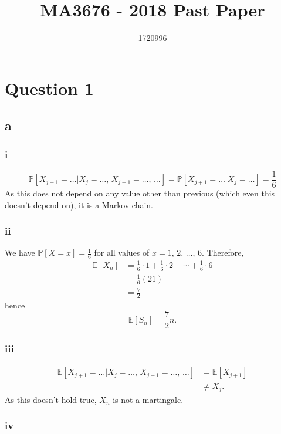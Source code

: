 \documentclass{article}
\title{MA3676 -  2018 Past Paper}
\author{1720996}
\newcommand{\Prob}{\mathbb{P}}
\newcommand{\E}{\mathbb{E}}
\begin{document}
\maketitle
\tableofcontents
\pagebreak

\section{Question 1}
\subsection{a}
\subsubsection{i}
\begin{equation}
    \Prob[X_{j+1}=\ldots\vert X_j=\ldots,\,X_{j-1}=\ldots,\,\ldots] = \Prob[X_{j+1}=\ldots\vert X_j=\ldots] = \frac{1}{6}     
\end{equation}
As this does not depend on any value other than previous (which even this doesn't depend on), it is a Markov chain.

\subsubsection{ii}
We have $\Prob[X=x]=\frac{1}{6}$ for all values of $x=1,\,2,\,\ldots,\,6$. Therefore,
\begin{align}
    \E[X_n] &= \frac{1}{6}\cdot 1 + \frac{1}{6}\cdot 2 + \cdots + \frac{1}{6}\cdot 6 \\
    &= \frac{1}{6}(21) \\
    &= \frac{7}{2}
\end{align}
hence 
\begin{equation}
    \E[S_n] = \frac{7}{2}n.
\end{equation}

\subsubsection{iii}
\begin{align}
    \E[X_{j+1}=\ldots\vert X_j=\ldots,\,X_{j-1}=\ldots,\,\ldots] &= \E[X_{j+1}] \\
    &\neq X_j.
\end{align}
As this doesn't hold true, $X_n$ is not a martingale.

\subsubsection{iv}
\end{document}
